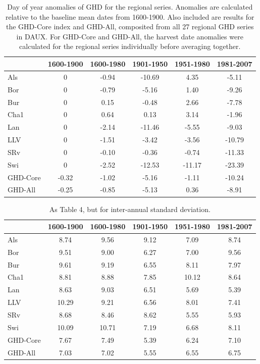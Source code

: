 \documentclass[12pt]{article}
\begin{document}
\begin{table}
\small
\caption{\small Day of year anomalies of GHD for the regional series. Anomalies are calculated relative to the baseline mean dates from 1600-1900. Also included are results for the GHD-Core index and GHD-All, composited from all 27 regional GHD series in DAUX. For GHD-Core and GHD-All, the harvest date anomalies were calculated for the regional series individually before averaging together.}
\centering
\begin{tabular}{l c c c c c}
\hline
& \bf 1600-1900 & \bf 1600-1980 & \bf 1901-1950 & \bf 1951-1980 & \bf 1981-2007\\
\hline
Als	& 0	& -0.94 & -10.69 & 4.35 & -5.11\\
Bor	& 0 & -0.79 & -5.16 & 1.40 & -9.26\\
Bur	& 0	& 0.15	& -0.48	& 2.66	& -7.78\\
Cha1	& 0	& 0.64	& 0.13	& 3.14	& -1.96\\
Lan & 0 & -2.14 & -11.46 & -5.55 & -9.03\\
LLV	& 0	& -1.51	& -3.42	& -3.56	& -10.79\\
SRv & 0	& -0.10	& -0.36	& -0.74	& -11.33\\
Swi	& 0	& -2.52	& -12.53	& -11.17	& -23.39\\
\hline
GHD-Core & -0.32 & -1.02	& -5.16 & -1.11 & -10.24\\
GHD-All	& -0.25 & -0.85 & -5.13 & 0.36 & -8.91\\
\hline
\end{tabular}
\end{table}

\begin{table}
\small
\caption{\small As Table 4, but for inter-annual standard deviation.}
\centering
\begin{tabular}{l c c c c c}
\hline
& \bf 1600-1900 & \bf 1600-1980 & \bf 1901-1950 & \bf 1951-1980 & \bf 1981-2007\\
\hline
Als	& 8.74	& 9.56	& 9.12	& 7.09	& 8.74\\
Bor	& 9.51	& 9.00	& 6.27	& 7.00	& 9.56\\
Bur	& 9.61 & 9.19 & 6.55 & 8.11 & 7.97\\
Cha1 & 8.81 & 8.88 & 7.85 & 10.12 & 8.64\\
Lan & 8.63 & 9.03 & 6.51 & 5.69 & 5.39\\
LLV	& 10.29 & 9.21 & 6.56 & 8.01 & 7.41\\
SRv & 8.68 & 8.46 & 8.62 & 5.55 & 5.93\\
Swi	& 10.09	& 10.71	& 7.19	& 6.68	& 8.11\\
\hline
GHD-Core & 7.67 & 7.49 & 5.39 & 6.24 & 7.10\\
GHD-All	& 7.03 & 7.02 & 5.55 & 6.55 & 6.75\\
\hline
\end{tabular}
\end{table}
\end{document}
